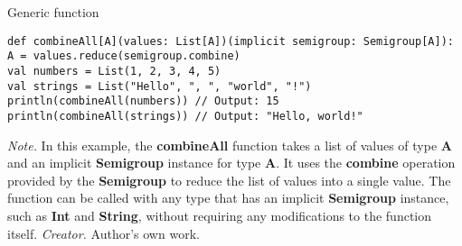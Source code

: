 \begin{table}[h!]
\caption{Generic function}
\begin{lstlisting}
def combineAll[A](values: List[A])(implicit semigroup: Semigroup[A]): A = values.reduce(semigroup.combine)
val numbers = List(1, 2, 3, 4, 5)
val strings = List("Hello", ", ", "world", "!")
println(combineAll(numbers)) // Output: 15
println(combineAll(strings)) // Output: "Hello, world!"
\end{lstlisting}
\small
\textit{Note.} In this example, the \textbf{combineAll} function takes a list of values of type \textbf{A} and an implicit \textbf{Semigroup} instance for type \textbf{A}. It uses the \textbf{combine} operation provided by the \textbf{Semigroup} to reduce the list of values into a single value. The function can be called with any type that has an implicit \textbf{Semigroup} instance, such as \textbf{Int} and \textbf{String}, without requiring any modifications to the function itself.
\textit{Creator.} Author's own work.
\end{table}